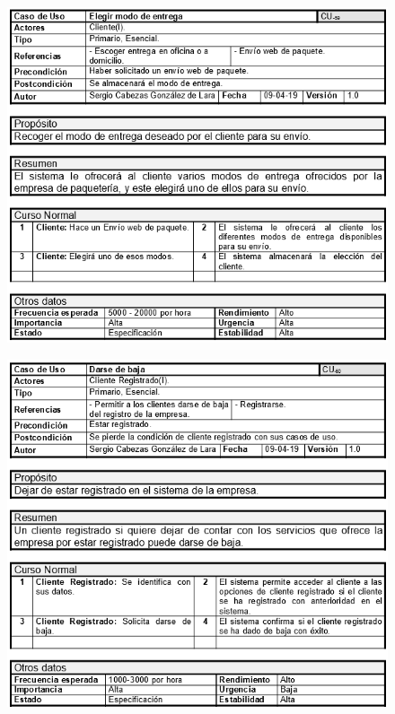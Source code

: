 \begin{figure}[H]
	\centering
	\includegraphics[width=16cm]{59}
\end{figure}
\begin{figure}[H]
	\centering
	\includegraphics[width=16cm]{60}
\end{figure}
